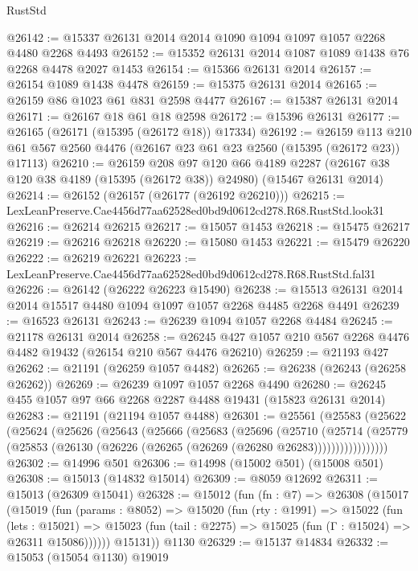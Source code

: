 \begin{lexlean}{RustStd}
\begin{coremodule}
@26142 := @15337 @26131 @2014 @2014 @1090 @1094 @1097 @1057 @2268 @4480 @2268 @4493
@26152 := @15352 @26131 @2014 @1087 @1089 @1438 @76 @2268 @4478 @2027 @1453
@26154 := @15366 @26131 @2014
@26157 := @26154 @1089 @1438 @4478
@26159 := @15375 @26131 @2014
@26165 := @26159 @86 @1023 @61 @831 @2598 @4477
@26167 := @15387 @26131 @2014
@26171 := @26167 @18 @61 @18 @2598
@26172 := @15396 @26131
@26177 := @26165 (@26171 (@15395 (@26172 @18)) @17334)
@26192 := @26159
    @113
    @210
    @61
    @567
    @2560
    @4476
    (@26167 @23 @61 @23 @2560 (@15395 (@26172 @23)) @17113)
@26210 := @26159
    @208
    @97
    @120
    @66
    @4189
    @2287
    (@26167 @38 @120 @38 @4189 (@15395 (@26172 @38)) @24980)
    (@15467 @26131 @2014)
@26214 := @26152 (@26157 (@26177 (@26192 @26210)))
@26215 := LexLeanPreserve.Cae4456d77aa62528ed0bd9d0612cd278.R68.RustStd.look31
@26216 := @26214 @26215
@26217 := @15057 @1453
@26218 := @15475 @26217
@26219 := @26216 @26218
@26220 := @15080 @1453
@26221 := @15479 @26220
@26222 := @26219 @26221
@26223 := LexLeanPreserve.Cae4456d77aa62528ed0bd9d0612cd278.R68.RustStd.fal31
@26226 := @26142 (@26222 @26223 @15490)
@26238 := @15513 @26131 @2014 @2014 @15517 @4480 @1094 @1097 @1057 @2268 @4485 @2268 @4491
@26239 := @16523 @26131
@26243 := @26239 @1094 @1057 @2268 @4484
@26245 := @21178 @26131 @2014
@26258 := @26245 @427 @1057 @210 @567 @2268 @4476 @4482 @19432 (@26154 @210 @567 @4476 @26210)
@26259 := @21193 @427
@26262 := @21191 (@26259 @1057 @4482)
@26265 := @26238 (@26243 (@26258 @26262))
@26269 := @26239 @1097 @1057 @2268 @4490
@26280 := @26245 @455 @1057 @97 @66 @2268 @2287 @4488 @19431 (@15823 @26131 @2014)
@26283 := @21191 (@21194 @1057 @4488)
@26301 := @25561
    (@25583
      (@25622
        (@25624
          (@25626
            (@25643
              (@25666
                (@25683
                  (@25696
                    (@25710
                      (@25714
                        (@25779
                          (@25853 (@26130 (@26226 (@26265 (@26269 (@26280 @26283)))))))))))))))))
@26302 := @14996 @501
@26306 := @14998 (@15002 @501) (@15008 @501)
@26308 := @15013 (@14832 @15014)
@26309 := @8059 @12692
@26311 := @15013 (@26309 @15041)
@26328 := @15012
    (fun (fn : @7) =>
    @26308
      (@15017
        (@15019
          (fun (params : @8052) =>
          @15020
            (fun (rty : @1991) =>
            @15022
              (fun (lets : @15021) =>
              @15023 (fun (tail : @2275) => @15025 (fun (Γ : @15024) => @26311 @15086))))))
        @15131))
    @1130
@26329 := @15137 @14834
@26332 := @15053 (@15054 @1130) @19019

\end{coremodule}
\end{lexlean}
